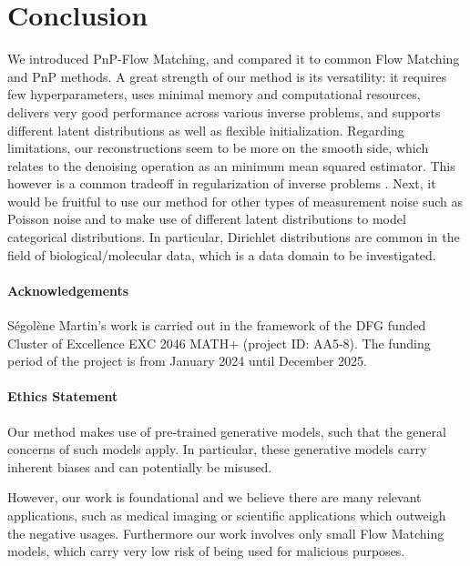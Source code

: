 \documentclass{article} %
\theoremstyle{definition}
\begin{document}
\section{Conclusion}
We introduced PnP-Flow Matching, and compared it to common Flow Matching and PnP methods. A great strength of our method is its versatility: it requires few hyperparameters, uses minimal memory and computational resources, delivers very good performance across various inverse problems, and supports different latent distributions as well as flexible initialization. Regarding limitations, our reconstructions seem to be more on the smooth side, which relates to the denoising operation as an minimum mean squared estimator. This however is a common tradeoff in regularization of inverse problems \citep{Blau_2018}. Next, it would be fruitful to use our method for other types of measurement noise such as Poisson noise \citep{hurault23poission} and to make use of different latent distributions \citep{boll2024,gat2024discreteflowmatching, stark2024dirichlet} to model categorical distributions. In particular, Dirichlet distributions are common in the field of biological/molecular data, which is a data domain to be investigated. 





\newpage

\paragraph{Acknowledgements}
S\'egol\`ene Martin's work is carried out in the framework of the DFG funded Cluster of Excellence EXC 2046 MATH+ (project ID: AA5-8). The funding period of the project is from January 2024 until December 2025.

\paragraph{Ethics Statement}
Our method makes use of pre-trained generative models, such that the general concerns of such models apply. In particular, these generative models carry inherent biases and can potentially be misused. 

However, our work is foundational and we believe there are many relevant applications, such as medical imaging or scientific applications which outweigh the negative usages. Furthermore our work involves only small Flow Matching models, which carry very low risk of being used for malicious purposes.
\end{document}
